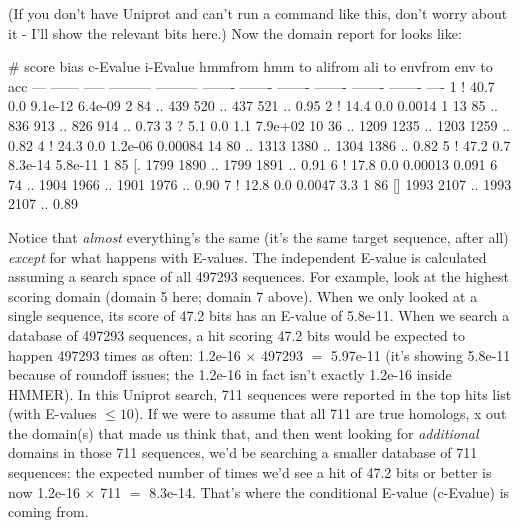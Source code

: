 
(If you don't have Uniprot and can't run a command like this, don't
worry about it - I'll show the relevant bits here.) Now the domain
report for  looks like:

\begin{sreoutput}
   #    score  bias  c-Evalue  i-Evalue hmmfrom  hmm to    alifrom  ali to    envfrom  env to     acc
 ---   ------ ----- --------- --------- ------- -------    ------- -------    ------- -------    ----
   1 !   40.7   0.0   9.1e-12   6.4e-09       2      84 ..     439     520 ..     437     521 .. 0.95
   2 !   14.4   0.0    0.0014         1      13      85 ..     836     913 ..     826     914 .. 0.73
   3 ?    5.1   0.0       1.1   7.9e+02      10      36 ..    1209    1235 ..    1203    1259 .. 0.82
   4 !   24.3   0.0   1.2e-06   0.00084      14      80 ..    1313    1380 ..    1304    1386 .. 0.82
   5 !   47.2   0.7   8.3e-14   5.8e-11       1      85 [.    1799    1890 ..    1799    1891 .. 0.91
   6 !   17.8   0.0   0.00013     0.091       6      74 ..    1904    1966 ..    1901    1976 .. 0.90
   7 !   12.8   0.0    0.0047       3.3       1      86 []    1993    2107 ..    1993    2107 .. 0.89
\end{sreoutput}

Notice that \emph{almost} everything's the same (it's the same target
sequence, after all) \emph{except} for what happens with E-values. The
independent E-value is calculated assuming a search space of all
497293 sequences. For example, look at the highest scoring domain
(domain 5 here; domain 7 above). When we only looked at a single
sequence, its score of 47.2 bits has an E-value of 5.8e-11. When we
search a database of 497293 sequences, a hit scoring 47.2 bits would
be expected to happen 497293 times as often: 1.2e-16 $\times$ 497293
$=$ 5.97e-11 (it's showing 5.8e-11 because of roundoff issues; the
1.2e-16 in fact isn't exactly 1.2e-16 inside HMMER). In this Uniprot
search, 711 sequences were reported in the top hits list (with
E-values $\leq 10$). If we were to assume that all 711 are true
homologs, x out the domain(s) that made us think that, and then went
looking for \emph{additional} domains in those 711 sequences, we'd be
searching a smaller database of 711 sequences: the expected number of
times we'd see a hit of 47.2 bits or better is now 1.2e-16 $\times$
711 $=$ 8.3e-14. That's where the conditional E-value (c-Evalue) is
coming from.

